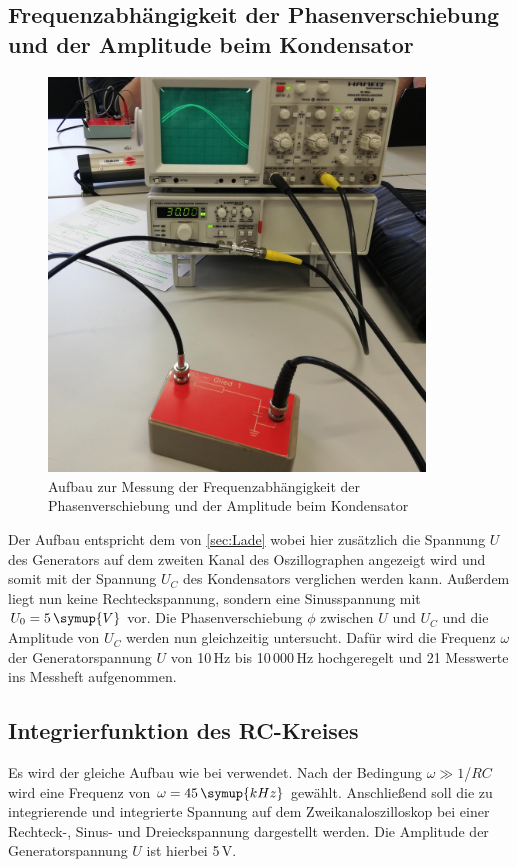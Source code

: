 \subsection{Frequenzabhängigkeit der Phasenverschiebung und der Amplitude beim Kondensator}
\label{sec:freq}
\begin{figure}
    \centering
    \includegraphics[width=10cm]{content/Aufbau.jpg}
    \caption{Aufbau zur Messung der Frequenzabhängigkeit der Phasenverschiebung und der Amplitude beim Kondensator}
\end{figure}
\noindent Der Aufbau entspricht dem von \ref{sec:Lade} wobei hier
zusätzlich die Spannung $U$ des Generators auf dem
zweiten Kanal des Oszillographen angezeigt wird und
somit mit der Spannung $U_C$ des Kondensators verglichen
werden kann. Außerdem liegt nun keine Rechteckspannung,
sondern eine Sinusspannung mit $U_0=5\,\symup{V} $ vor.
Die Phasenverschiebung $\phi$ zwischen $U$ und $U_C$
und die Amplitude von $U_C$ werden nun gleichzeitig
untersucht. Dafür wird die Frequenz $\omega$ der
Generatorspannung $U$ von 10\,Hz bis 10\,000\,Hz
hochgeregelt und 21 Messwerte ins Messheft aufgenommen.

\subsection{Integrierfunktion des RC-Kreises}
Es wird der gleiche Aufbau wie bei \label{sec:freq} verwendet.
Nach der Bedingung $\omega \gg 1$/$RC$ wird
eine Frequenz von $\omega=45\,\symup{kHz}$ gewählt.
Anschließend soll die zu integrierende und integrierte
Spannung auf dem Zweikanaloszilloskop bei einer
Rechteck-, Sinus- und Dreieckspannung dargestellt werden.
Die Amplitude der Generatorspannung $U$ ist hierbei
5\,V.


